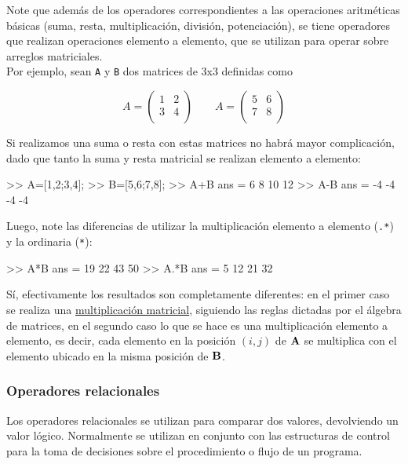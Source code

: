 Note que además de los operadores correspondientes a las operaciones
aritméticas básicas (suma, resta, multiplicación, división,
potenciación), se tiene operadores que realizan operaciones elemento a
elemento, que se utilizan para operar sobre arreglos matriciales.\\

Por ejemplo, sean \texttt{A} y \texttt{B} dos matrices de 3x3 definidas
como

$$
A = \begin{pmatrix}
1 & 2 \\
3 & 4 \\
\end{pmatrix}
\,\,\,\,\,\,\,\,\,\,\,\,
A = \begin{pmatrix}
5 & 6 \\
7 & 8 \\
\end{pmatrix}
$$

Si realizamos una suma o resta con estas matrices no habrá mayor
complicación, dado que tanto la suma y resta matricial se realizan
elemento a elemento:

\begin{matlab}
>> A=[1,2;3,4];
>> B=[5,6;7,8];
>> A+B
ans =
     6     8
    10    12
>> A-B
ans =
    -4    -4
    -4    -4
\end{matlab}

Luego, note las diferencias de utilizar la multiplicación elemento a
elemento (\texttt{.*}) y la ordinaria (\texttt{*}):

\begin{matlab}
>> A*B
ans =
    19    22
    43    50
>> A.*B
ans =
     5    12
    21    32
\end{matlab}

Sí, efectivamente los resultados son completamente diferentes: en el
primer caso se realiza una
\href{https://es.wikipedia.org/wiki/Multiplicaci\%C3\%B3n_de_matrices}{multiplicación
matricial}, siguiendo las reglas dictadas por el álgebra de matrices, en
el segundo caso lo que se hace es una multiplicación elemento a
elemento, es decir, cada elemento en la posición $(i,j)$ de
$\bf{A}$ se multiplica con el elemento ubicado en la misma
posición de $\bf{B}$.

\subsubsection{Operadores relacionales}\label{operadores-relacionales}

Los operadores relacionales se utilizan para comparar dos valores,
devolviendo un valor lógico. Normalmente se utilizan en conjunto con las
estructuras de control para la toma de decisiones sobre el procedimiento
o flujo de un programa.\\

